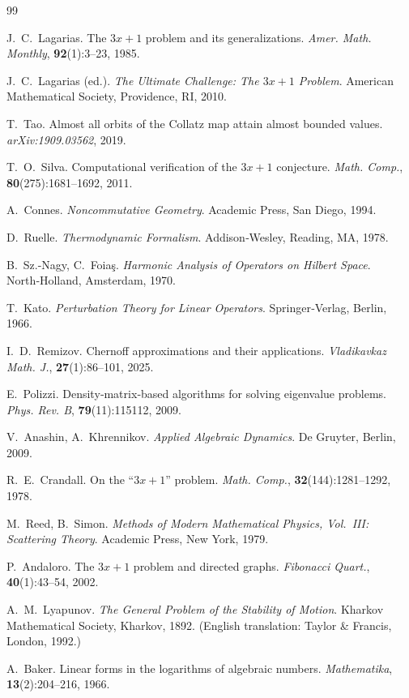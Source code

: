 \documentclass[12pt,a4paper]{article}
\theoremstyle{definition}
\theoremstyle{remark}
\begin{document}
\begin{thebibliography}{99}

J.~C.~Lagarias.
The $3x+1$ problem and its generalizations.
\textit{Amer. Math. Monthly}, \textbf{92}(1):3--23, 1985.

J.~C.~Lagarias (ed.).
\textit{The Ultimate Challenge: The $3x+1$ Problem}.
American Mathematical Society, Providence, RI, 2010.

T.~Tao.
Almost all orbits of the Collatz map attain almost bounded values.
\textit{arXiv:1909.03562}, 2019.

T.~O.~Silva.
Computational verification of the $3x+1$ conjecture.
\textit{Math. Comp.}, \textbf{80}(275):1681--1692, 2011.

A.~Connes.
\textit{Noncommutative Geometry}.
Academic Press, San Diego, 1994.

D.~Ruelle.
\textit{Thermodynamic Formalism}.
Addison‑Wesley, Reading, MA, 1978.

B.~Sz.-Nagy, C.~Foia\c{s}.
\textit{Harmonic Analysis of Operators on Hilbert Space}.
North‑Holland, Amsterdam, 1970.

T.~Kato.
\textit{Perturbation Theory for Linear Operators}.
Springer‑Verlag, Berlin, 1966.

I.~D.~Remizov.
Chernoff approximations and their applications.
\textit{Vladikavkaz Math. J.}, \textbf{27}(1):86--101, 2025.

E.~Polizzi.
Density‑matrix‑based algorithms for solving eigenvalue problems.
\textit{Phys. Rev. B}, \textbf{79}(11):115112, 2009.

V.~Anashin, A.~Khrennikov.
\textit{Applied Algebraic Dynamics}.
De Gruyter, Berlin, 2009.

R.~E.~Crandall.
On the ``$3x+1$'' problem.
\textit{Math. Comp.}, \textbf{32}(144):1281--1292, 1978.

M.~Reed, B.~Simon.
\textit{Methods of Modern Mathematical Physics, Vol.~III: Scattering
Theory}.
Academic Press, New York, 1979.

P.~Andaloro.
The $3x+1$ problem and directed graphs.
\textit{Fibonacci Quart.}, \textbf{40}(1):43--54, 2002.

A.~M.~Lyapunov.
\textit{The General Problem of the Stability of Motion}.
Kharkov Mathematical Society, Kharkov, 1892.
(English translation: Taylor \& Francis, London, 1992.)

A.~Baker.
Linear forms in the logarithms of algebraic numbers.
\textit{Mathematika}, \textbf{13}(2):204--216, 1966.

\end{thebibliography}
\end{document}
